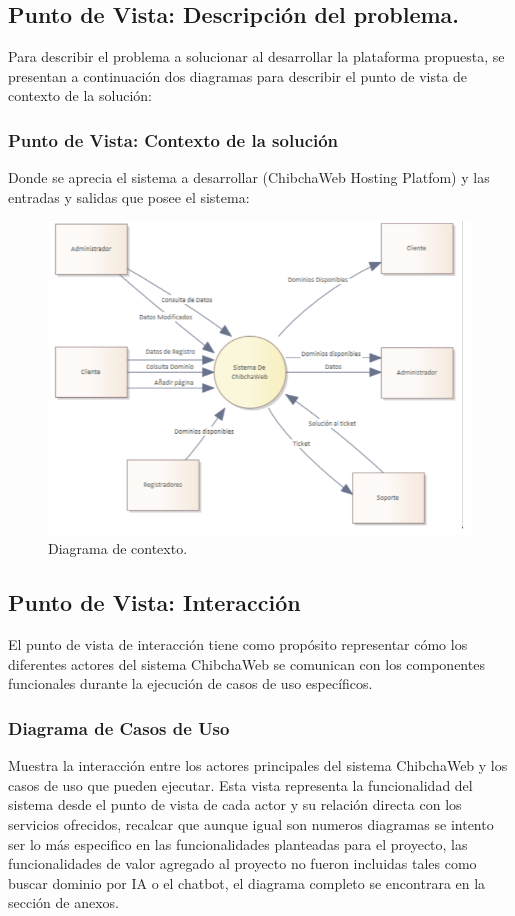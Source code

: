 \subsection{Punto de Vista: Descripción del problema.}
Para describir el problema a solucionar al desarrollar la plataforma propuesta, se presentan a continuación dos diagramas para describir el punto de vista de contexto de la solución:

\subsubsection{Punto de Vista: Contexto de la solución}
Donde se aprecia el sistema a desarrollar (ChibchaWeb Hosting Platfom) y las entradas y salidas que posee el sistema:

\begin{figure}[H]
    \centering
	\includegraphics[width=0.8\linewidth]{puntovista/dia-contexto.png}
	\caption{Diagrama de contexto.}
	\label{fig:dia-contexto}
\end{figure}

\subsection{Punto de Vista: Interacción}
El punto de vista de interacción tiene como propósito representar cómo los diferentes actores del sistema ChibchaWeb se comunican con los componentes funcionales durante la ejecución de casos de uso específicos.

\subsubsection{Diagrama de Casos de Uso}

Muestra la interacción entre los actores principales del sistema ChibchaWeb y los casos de uso que pueden ejecutar. Esta vista representa la funcionalidad del sistema desde el punto de vista de cada actor y su relación directa con los servicios ofrecidos, recalcar que aunque igual son numeros diagramas se intento ser lo más especifico en las funcionalidades planteadas para el proyecto, las funcionalidades de valor agregado al proyecto no fueron incluidas tales como buscar dominio por IA o el chatbot, el diagrama completo se encontrara en la sección de anexos.

